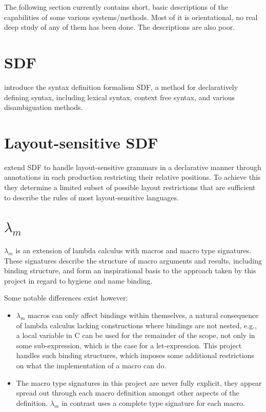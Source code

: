 \documentclass{kththesis}
\begin{document}
The following section currently contains short, basic descriptions of the capabilities of some various systems/methods. Most of it is orientational, no real deep study of any of them has been done. The descriptions are also poor.

\section{SDF}

\textcite{Heering1989} introduce the syntax definition formalism SDF, a method for declaratively defining syntax, including lexical syntax, context free syntax, and various disambiguation methods.

\section{Layout-sensitive SDF}

\textcite{Erdweg2013} extend SDF to handle layout-sensitive grammars in a declarative manner through annotations in each production restricting their relative positions. To achieve this they determine a limited subset of possible layout restrictions that are sufficient to describe the rules of most layout-sensitive languages.

\section{$\lambda_m$}

$\lambda_m$ \cite{Herman2010} is an extension of lambda calculus with macros and macro type signatures. These signatures describe the structure of macro arguments and results, including binding structure, and form an inspirational basis to the approach taken by this project in regard to hygiene and name binding.

Some notable differences exist however:
\begin{itemize}
  \item $\lambda_m$ macros can only affect bindings within themselves, a natural consequence of lambda calculus lacking constructions where bindings are not nested, e.g., a local variable in C can be used for the remainder of the scope, not only in some sub-expression, which is the case for a let-expression. This project handles such binding structures, which imposes some additional restrictions on what the implementation of a macro can do.
  \item The macro type signatures in this project are never fully explicit, they appear spread out through each macro definition amongst other aspects of the definition. $\lambda_m$ in contrast uses a complete type signature for each macro.
\end{itemize}
\end{document}
